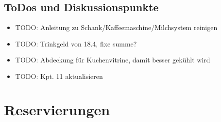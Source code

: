\documentclass[a4paper,12pt]{article}
\begin{document}
\subsection{ToDos und Diskussionspunkte}\label{subsec:todos}
\begin{itemize}
    \item TODO: Anleitung zu Schank/Kaffeemaschine/Milchsystem reinigen
    \item TODO: Trinkgeld von 18.4, fixe summe?
    \item TODO: Abdeckung für Kuchenvitrine, damit besser gekühlt wird
    \item TODO: Kpt. 11 aktualisieren 
\end{itemize}


\clearpage
\section{Reservierungen}\label{sec:reservierungen}
\end{document}
